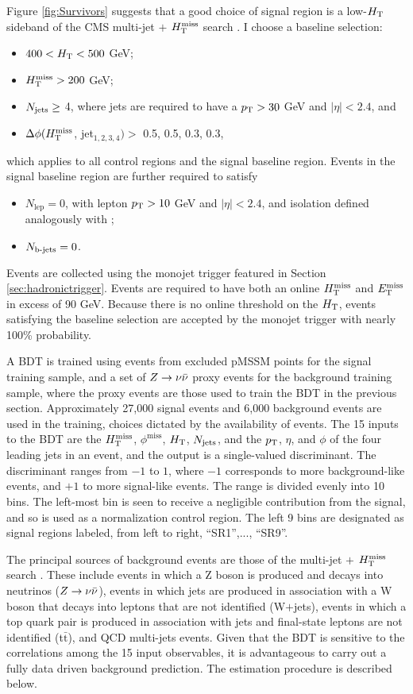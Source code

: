 Figure \ref{fig:Survivors} suggests that a good choice of signal region is a low-$H_{\rm T}$ sideband of the CMS multi-jet $+$ $H_{\text{T}}^{\rm miss}$ search \cite{Khachatryan:2016kdk}. I choose a baseline selection:
\begin{itemize}
\item $400<H_{\rm T}<500$ GeV;
\item $H_{\text{T}}^{\rm miss}>200$ GeV;
\item $N_{\rm jets}\geq$ 4, where jets are required to have a $p_{\text{T}}>30$ GeV and $|\eta|<2.4$, and
\item $\Delta\phi(H_{\text{T}}^{\rm miss}$, jet$_{1,2,3,4})>$ 0.5, 0.5, 0.3, 0.3,
\end{itemize}
which applies to all control regions and the signal baseline region. Events in the signal baseline region are further required to satisfy 
\begin{itemize}
\item $N_{\text{lep}}=0$, with lepton $p_{\text{T}}>10$ GeV and $|\eta|<2.4$, and isolation defined analogously with  \cite{Khachatryan:2016kdk};
\item $N_{\text{b-jets}}=0$.
\end{itemize}

Events are collected using the monojet trigger featured in Section \ref{sec:hadronictrigger}. Events are required to have both an online $H_{\text{T}}^{\rm miss}$ and $E_{\text{T}}^{\rm miss}$ in excess of 90 GeV. Because there is no online threshold on the $H_{\rm T}$, events satisfying the baseline selection are accepted by the monojet trigger with nearly 100\% probability.

A BDT is trained using events from excluded pMSSM points for the signal training sample, and a set of $Z\rightarrow \nu\bar{\nu}$ proxy events for the background training sample, where the proxy events are those used to train the BDT in the previous section. Approximately 27,000 signal events and 6,000 background events are used in the training, choices dictated by the availability of events. The 15 inputs to the BDT are the $H_{\text{T}}^{\rm miss}$, $\phi^{\text{miss}}$, $H_{\rm T}$, $N_{\rm jets}$, and the $p_{\text{T}}$, $\eta$, and $\phi$ of the four leading jets in an event, and the output is a single-valued discriminant. The discriminant ranges from $-1$ to $1$, where $-1$ corresponds to more background-like events, and $+1$ to more signal-like events. The range is divided evenly into 10 bins. The left-most bin is seen to receive a negligible contribution from the signal, and so is used as a normalization control region. The left 9 bins are designated as signal regions labeled, from left to right, ``SR1'',..., ``SR9''.

The principal sources of background events are those of the multi-jet $+$ $H_{\text{T}}^{\rm miss}$ search \cite{Khachatryan:2016kdk}. These include events in which a Z boson is produced and decays into neutrinos ($Z\rightarrow \nu\bar{\nu}$), events in which jets are produced in association with a W boson that decays into leptons that are not identified (W$+$jets), events in which a top quark pair is produced in association with jets and final-state leptons are not identified (t$\bar{\text{t}}$), and QCD multi-jets events. Given that the BDT is sensitive to the correlations among the 15 input observables, it is advantageous to carry out a fully data driven background prediction. The estimation procedure is described below.

